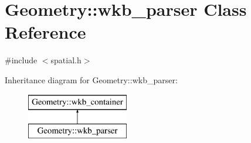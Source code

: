 \hypertarget{classGeometry_1_1wkb__parser}{}\section{Geometry\+:\+:wkb\+\_\+parser Class Reference}
\label{classGeometry_1_1wkb__parser}


{\ttfamily \#include $<$spatial.\+h$>$}

Inheritance diagram for Geometry\+:\+:wkb\+\_\+parser\+:\begin{figure}[H]
\begin{center}
\leavevmode
\includegraphics[height=2.000000cm]{classGeometry_1_1wkb__parser}
\end{center}
\end{figure}
